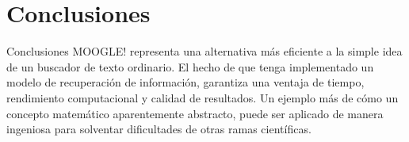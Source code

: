 \documentclass[aspectratio = 169]{beamer}
\begin{document}
\section{Conclusiones}
\begin{frame}{Conclusiones}
\justifying
MOOGLE! representa una alternativa más eficiente a la simple idea de un buscador de texto ordinario. El hecho de que tenga implementado un modelo de recuperación de información, garantiza una ventaja de tiempo, rendimiento computacional y calidad de resultados. Un ejemplo más de cómo un concepto matemático aparentemente abstracto, puede ser aplicado de manera ingeniosa para solventar dificultades de otras ramas científicas.
\end{frame}
\end{document}
